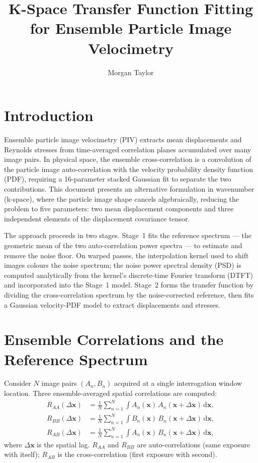 \documentclass[11pt,a4paper]{article}
\title{K-Space Transfer Function Fitting\\for Ensemble Particle Image Velocimetry}
\author{Morgan Taylor}
\date{}
\newcommand{\xv}{\mathbf{x}}
\begin{document}
\maketitle

\section{Introduction}
\label{sec:intro}

Ensemble particle image velocimetry (PIV) extracts mean displacements and Reynolds stresses from time-averaged correlation planes accumulated over many image pairs.
In physical space, the ensemble cross-correlation is a convolution of the particle image auto-correlation with the velocity probability density function (PDF), requiring a 16-parameter stacked Gaussian fit to separate the two contributions.
This document presents an alternative formulation in wavenumber (k-space), where the particle image shape cancels algebraically, reducing the problem to five parameters: two mean displacement components and three independent elements of the displacement covariance tensor.

The approach proceeds in two stages.
Stage~1 fits the reference spectrum --- the geometric mean of the two auto-correlation power spectra --- to estimate and remove the noise floor.
On warped passes, the interpolation kernel used to shift images colours the noise spectrum; the noise power spectral density (PSD) is computed analytically from the kernel's discrete-time Fourier transform (DTFT) and incorporated into the Stage~1 model.
Stage~2 forms the transfer function by dividing the cross-correlation spectrum by the noise-corrected reference, then fits a Gaussian velocity-PDF model to extract displacements and stresses.

\section{Ensemble Correlations and the Reference Spectrum}
\label{sec:correlations}

Consider $N$ image pairs $(A_n, B_n)$ acquired at a single interrogation window location.
Three ensemble-averaged spatial correlations are computed:
%
\begin{align}
    R_{AA}(\Delta\xv) &= \frac{1}{N} \sum_{n=1}^{N} \int A_n(\xv)\, A_n(\xv + \Delta\xv)\, \mathrm{d}\xv, \label{eq:raa} \\
    R_{BB}(\Delta\xv) &= \frac{1}{N} \sum_{n=1}^{N} \int B_n(\xv)\, B_n(\xv + \Delta\xv)\, \mathrm{d}\xv, \label{eq:rbb} \\
    R_{AB}(\Delta\xv) &= \frac{1}{N} \sum_{n=1}^{N} \int A_n(\xv)\, B_n(\xv + \Delta\xv)\, \mathrm{d}\xv, \label{eq:rab}
\end{align}
%
where $\Delta\xv$ is the spatial lag.
$R_{AA}$ and $R_{BB}$ are auto-correlations (same exposure with itself); $R_{AB}$ is the cross-correlation (first exposure with second).
\end{document}
